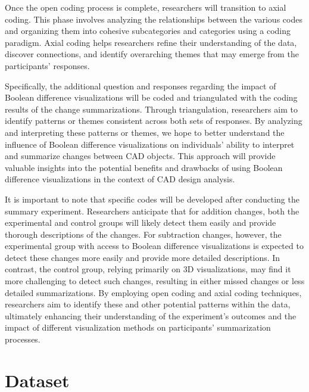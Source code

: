 \documentclass[sigconf,authorversion,nonacm]{acmart}
\begin{document}
Once the open coding process is complete, researchers will transition to axial coding. This phase involves analyzing the relationships between the various codes and organizing them into cohesive subcategories and categories using a coding paradigm.
Axial coding helps researchers refine their understanding of the data, discover connections, and identify overarching themes that may emerge from the participants' responses.

Specifically, the additional question and responses regarding the impact of Boolean difference visualizations will be coded and triangulated with the coding results of the change summarizations.
Through triangulation, researchers aim to identify patterns or themes consistent across both sets of responses. By analyzing and interpreting these patterns or themes, we hope to better understand the influence of Boolean difference visualizations on individuals' ability to interpret and summarize changes between CAD objects.
This approach will provide valuable insights into the potential benefits and drawbacks of using Boolean difference visualizations in the context of CAD design analysis.

It is important to note that specific codes will be developed after conducting the summary experiment. Researchers anticipate that for addition changes, both the experimental and control groups will likely detect them easily and provide thorough descriptions of the changes.
For subtraction changes, however, the experimental group with access to Boolean difference visualizations is expected to detect these changes more easily and provide more detailed descriptions.
In contrast, the control group, relying primarily on 3D visualizations, may find it more challenging to detect such changes, resulting in either missed changes or less detailed summarizations.
By employing open coding and axial coding techniques, researchers aim to identify these and other potential patterns within the data, ultimately enhancing their understanding of the experiment's outcomes and the impact of different visualization methods on participants' summarization processes.


\section{Dataset}
\end{document}
